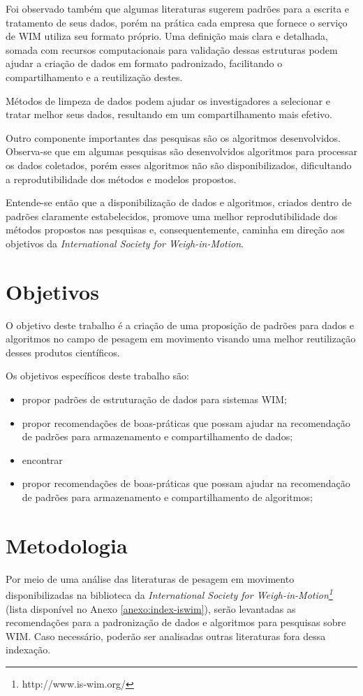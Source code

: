 \documentclass{ufscThesis}
\begin{document}
Foi observado também que algumas literaturas sugerem padrões para a escrita e tratamento de seus dados, porém na prática cada empresa que fornece o serviço de WIM utiliza seu formato próprio. Uma definição mais clara e detalhada, somada com recursos computacionais para validação dessas estruturas podem ajudar a criação de dados em formato padronizado, facilitando o compartilhamento e a reutilização destes.

Métodos de limpeza de dados podem ajudar os investigadores a selecionar e tratar melhor seus dados, resultando em um compartilhamento mais efetivo.

Outro componente importantes das pesquisas são os algoritmos desenvolvidos. Observa-se que em algumas pesquisas são desenvolvidos algoritmos para processar os dados coletados, porém esses algoritmos não são disponibilizados, dificultando a reprodutibilidade dos métodos e modelos propostos.

Entende-se então que a disponibilização de dados e algoritmos, criados dentro de padrões claramente estabelecidos, promove uma melhor reprodutibilidade dos métodos propostos nas pesquisas e, consequentemente, caminha em direção aos objetivos da \textit{International Society for Weigh-in-Motion}.

\section{Objetivos}\label{introducao-objetivos}

O objetivo deste trabalho é a criação de uma proposição de padrões para dados e algoritmos no campo de pesagem em movimento visando uma melhor reutilização desses produtos científicos.

Os objetivos específicos deste trabalho são:

\begin{itemize}
\item propor padrões de estruturação de dados para sistemas WIM;
\item propor recomendações de boas-práticas que possam ajudar na recomendação de padrões para armazenamento e compartilhamento de dados;
\item encontrar
\item propor recomendações de boas-práticas que possam ajudar na recomendação de padrões para armazenamento e compartilhamento de algoritmos;
\end{itemize}


\section{Metodologia}\label{introducao-metodologia}
Por meio de uma análise das literaturas de pesagem em movimento disponibilizadas na biblioteca da \textit{International Society for Weigh-in-Motion\footnote{http://www.is-wim.org/}} (lista disponível no Anexo \ref{anexo:index-iswim}), serão levantadas as recomendações para a padronização de dados e algoritmos para pesquisas sobre WIM. Caso necessário, poderão ser analisadas outras literaturas fora dessa indexação.
\end{document}
